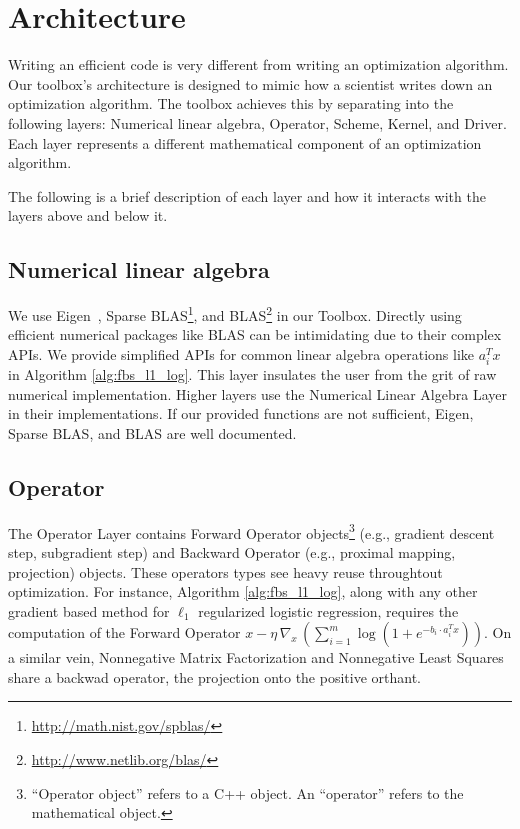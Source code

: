 \section{Architecture}


Writing an efficient code is very different from writing an optimization algorithm.
Our toolbox's architecture is designed to mimic how a scientist writes down an optimization algorithm.
The toolbox achieves this by separating into the following layers: Numerical linear algebra, Operator, Scheme, Kernel, and Driver.
Each layer represents a different mathematical component of an optimization algorithm.


The following is a brief description of each layer and how it interacts with the layers above and below it. 

\subsection{Numerical linear algebra}

We use Eigen~\citep{eigenweb}, Sparse BLAS\footnote{\url{http://math.nist.gov/spblas/}}, and BLAS\footnote{\url{http://www.netlib.org/blas/}} in our Toolbox.
Directly using efficient numerical packages like BLAS can be intimidating due to their complex APIs. We provide simplified APIs for common linear algebra operations like $a_i^T x$ in Algorithm \ref{alg:fbs_l1_log}. This layer insulates the user from the grit of raw numerical implementation. Higher layers use the Numerical Linear Algebra Layer in their implementations.
If our provided functions are not sufficient, Eigen, Sparse BLAS, and BLAS are well documented. 

\subsection{Operator}

The Operator Layer contains Forward Operator objects\footnote{``Operator object'' refers to a C++ object. An ``operator'' refers to the mathematical object.} (e.g., gradient descent step, subgradient step) and Backward Operator (e.g., proximal mapping, projection) objects. These operators types see heavy reuse throughtout optimization.
For instance, Algorithm \ref{alg:fbs_l1_log}, along with any other gradient based method for $\ell_1$ regularized logistic regression, requires the computation of the Forward Operator $x - \eta \, \nabla_x \,(\sum_{i = 1}^m \log (1 + e^{-b_i \cdot a_i^T x}))$. On a similar vein, Nonnegative Matrix Factorization and Nonnegative Least Squares share a backwad operator, the projection onto the positive orthant.

